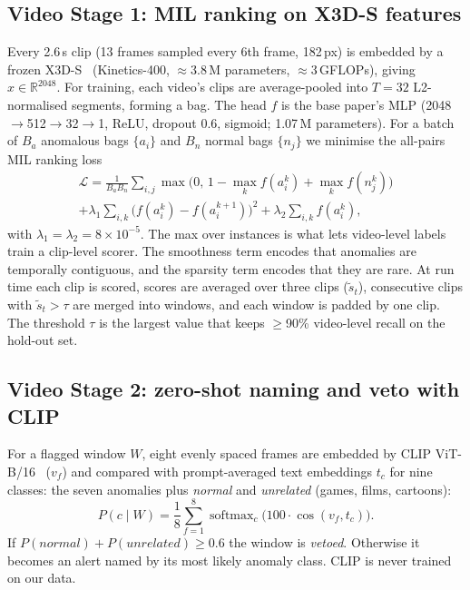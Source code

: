 \documentclass[conference,a4paper]{IEEEtran}
\begin{document}
\subsection{Video Stage 1: MIL ranking on X3D-S features}
Every 2.6\,s clip (13 frames sampled every 6th frame, 182\,px) is embedded by a frozen X3D-S~\cite{x3d}
(Kinetics-400, $\approx$3.8\,M parameters, $\approx$3\,GFLOPs), giving $x\in\mathbb{R}^{2048}$. For training, each
video's clips are average-pooled into $T{=}32$ L2-normalised segments, forming a bag. The head $f$ is the base
paper's MLP (2048$\to$512$\to$32$\to$1, ReLU, dropout 0.6, sigmoid; 1.07\,M parameters). For a batch of $B_a$
anomalous bags $\{a_i\}$ and $B_n$ normal bags $\{n_j\}$ we minimise the all-pairs MIL ranking loss
\begin{multline}
\mathcal{L}=\frac{1}{B_aB_n}\sum_{i,j}\max\!\bigl(0,\,1-\max_k f(a_i^k)+\max_k f(n_j^k)\bigr)\\
+\lambda_1\sum_{i,k}\bigl(f(a_i^k)-f(a_i^{k+1})\bigr)^2+\lambda_2\sum_{i,k}f(a_i^k),
\end{multline}
with $\lambda_1{=}\lambda_2{=}8{\times}10^{-5}$. The max over instances is what lets video-level labels train a
clip-level scorer. The smoothness term encodes that anomalies are temporally contiguous, and the sparsity term
encodes that they are rare. At run time each clip is scored, scores are averaged over three clips
($\tilde s_t$), consecutive clips with $\tilde s_t>\tau$ are merged into windows, and each window is padded by one
clip. The threshold $\tau$ is the largest value that keeps $\ge$90\% video-level recall on the hold-out set.

\subsection{Video Stage 2: zero-shot naming and veto with CLIP}
For a flagged window $W$, eight evenly spaced frames are embedded by CLIP ViT-B/16~\cite{clip} ($v_f$) and compared
with prompt-averaged text embeddings $t_c$ for nine classes: the seven anomalies plus \emph{normal} and
\emph{unrelated} (games, films, cartoons):
\begin{equation}
P(c\mid W)=\frac{1}{8}\sum_{f=1}^{8}\operatorname{softmax}_c\!\bigl(100\cdot\cos(v_f,t_c)\bigr).
\end{equation}
If $P(\textit{normal})+P(\textit{unrelated})\ge0.6$ the window is \emph{vetoed}. Otherwise it becomes an alert
named by its most likely anomaly class. CLIP is never trained on our data.
\end{document}
